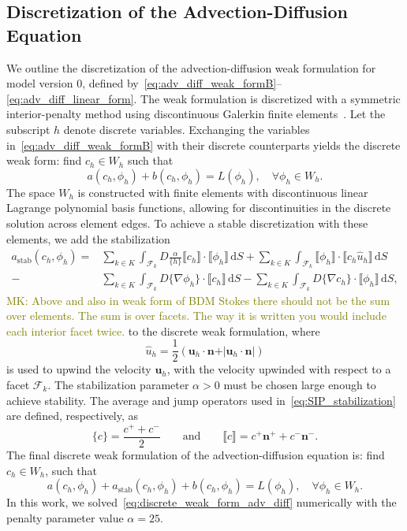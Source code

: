 \documentclass[fleqn]{wlscirep}
\newcommand{\intF}[1]{\int_{\mathcal{F}_k}#1 \, \mathrm dS}
\newcommand{\avg}[1]{\{#1\}}
\newcommand{\jump}[1]{\llbracket#1\rrbracket}
\newcommand{\nn}{\mathbf{n}}
\newcommand{\uu}{\mathbf{u}}
\newcommand{\mk}[1]{\textcolor{olive}{MK: #1}}
\begin{document}
\subsection{Discretization of the Advection-Diffusion Equation}
We outline the discretization of the advection-diffusion weak formulation for model version 0, defined by~\eqref{eq:adv_diff_weak_formB}--\eqref{eq:adv_diff_linear_form}. The weak formulation is discretized with a symmetric interior-penalty method using discontinuous Galerkin finite elements~\cite{Arnold1982AnElements}. Let the subscript $h$ denote discrete variables. Exchanging the variables in~\eqref{eq:adv_diff_weak_formB} with their discrete counterparts yields the discrete weak form: find $c_h\in W_h$ such that
\begin{equation*}
    a(c_h, \phi_h) + b(c_h, \phi_h) = L(\phi_h), \quad\forall\phi_h\in W_h.
\end{equation*}
The space $W_h$ is constructed with  finite elements with discontinuous linear Lagrange polynomial basis functions, allowing for discontinuities in the discrete solution across element edges.  To achieve a stable discretization with these elements, we add the stabilization
\begin{equation}
    \begin{aligned}
        a_{\mathrm{stab}}(c_h, \phi_h) = &\sum_{k\in K}\intF{D\frac{\alpha}{\avg{h}}\jump{c_h}\cdot\jump{\phi_h}} +\sum_{k\in K}\intF{\jump{\phi_h}\cdot\jump{c_h \hat{u}_h}}  \\
         -&\sum_{k\in K}\intF{D\avg{\nabla\phi_h}\cdot\jump{c_h}} -\sum_{k\in K}\intF{D\avg{\nabla c_h}\cdot\jump{\phi_h}},
    \end{aligned}\label{eq:SIP_stabilization}
\end{equation}
\mk{
Above and also in weak form of BDM Stokes there should not be the sum over elements.
The sum is over facets. The way it is written you would include each interior facet twice.
}
to the discrete weak formulation, where
\begin{equation*}
    \hat{u}_h = \frac{1}{2}\left(\uu_h\cdot\nn + \vert\uu_h\cdot\nn\vert\right)
\end{equation*}
is used to upwind the velocity $\uu_h$, with the velocity upwinded with respect to a facet $\mathcal{F}_k$. The stabilization parameter $\alpha>0$ must be chosen large enough to achieve stability. The average and jump operators used in~\eqref{eq:SIP_stabilization} are defined, respectively, as
\begin{equation*}
    \avg{c} = \frac{c^+ + c^-}{2} \qquad\mathrm{and}\qquad \jump{c} = c^+\nn^+ + c^-\nn^-.
\end{equation*}
The final discrete weak formulation of the advection-diffusion equation is: find $c_h\in W_h$, such that
\begin{equation}
    a(c_h, \phi_h) + a_{\mathrm{stab}}(c_h, \phi_h) + b(c_h, \phi_h) = L(\phi_h), \quad\forall\phi_h\in W_h.
    \label{eq:discrete_weak_form_adv_diff}
\end{equation}
In this work, we solved~\eqref{eq:discrete_weak_form_adv_diff} numerically with the penalty parameter value $\alpha=25$.
\end{document}
